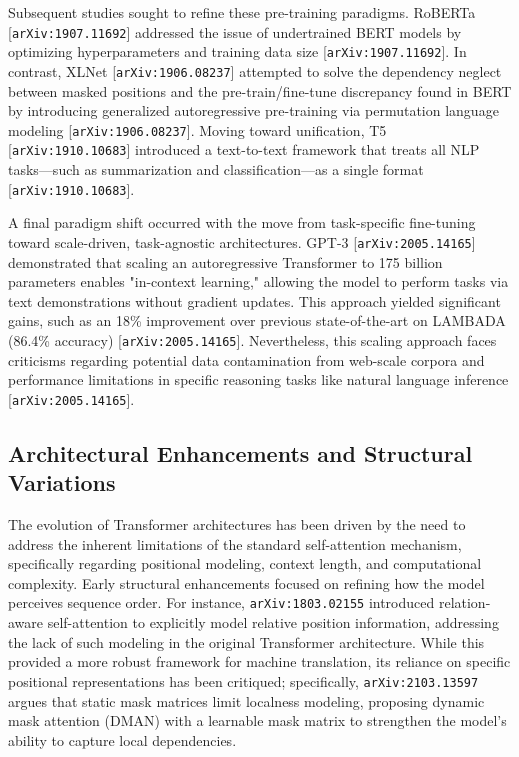 \documentclass[11pt]{article}
\begin{document}
Subsequent studies sought to refine these pre-training paradigms. RoBERTa [\texttt{arXiv:1907.11692}] addressed the issue of undertrained BERT models by optimizing hyperparameters and training data size [\texttt{arXiv:1907.11692}]. In contrast, XLNet [\texttt{arXiv:1906.08237}] attempted to solve the dependency neglect between masked positions and the pre-train/fine-tune discrepancy found in BERT by introducing generalized autoregressive pre-training via permutation language modeling [\texttt{arXiv:1906.08237}]. Moving toward unification, T5 [\texttt{arXiv:1910.10683}] introduced a text-to-text framework that treats all NLP tasks—such as summarization and classification—as a single format [\texttt{arXiv:1910.10683}].

A final paradigm shift occurred with the move from task-specific fine-tuning toward scale-driven, task-agnostic architectures. GPT-3 [\texttt{arXiv:2005.14165}] demonstrated that scaling an autoregressive Transformer to 175 billion parameters enables "in-context learning," allowing the model to perform tasks via text demonstrations without gradient updates. This approach yielded significant gains, such as an 18\% improvement over previous state-of-the-art on LAMBADA (86.4\% accuracy) [\texttt{arXiv:2005.14165}]. Nevertheless, this scaling approach faces criticisms regarding potential data contamination from web-scale corpora and performance limitations in specific reasoning tasks like natural language inference [\texttt{arXiv:2005.14165}].

\subsection{Architectural Enhancements and Structural Variations}

The evolution of Transformer architectures has been driven by the need to address the inherent limitations of the standard self-attention mechanism, specifically regarding positional modeling, context length, and computational complexity. Early structural enhancements focused on refining how the model perceives sequence order. For instance, \texttt{arXiv:1803.02155} introduced relation-aware self-attention to explicitly model relative position information, addressing the lack of such modeling in the original Transformer architecture. While this provided a more robust framework for machine translation, its reliance on specific positional representations has been critiqued; specifically, \texttt{arXiv:2103.13597} argues that static mask matrices limit localness modeling, proposing dynamic mask attention (DMAN) with a learnable mask matrix to strengthen the model's ability to capture local dependencies.
\end{document}
